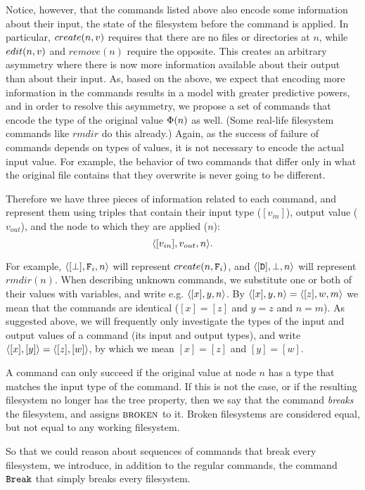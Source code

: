 Notice, however, that the commands listed above also encode some information about 
their input, the state of the filesystem
before the command is applied. In particular, $create(n,v)$ requires that there are no files
or directories at $n$, while $edit(n,v)$ and $remove(n)$ require the opposite.
This creates an arbitrary asymmetry where
there is now more information available about their output than about their input.
As, based on the above, we expect that encoding more information in the commands
results in a model with greater predictive powers,
and in order to resolve this asymmetry, 
we propose a set of commands that encode
the type of the original value $\Phi(n)$ as well.
(Some real-life filesystem commands like $rmdir$ do this already.)
Again, as the success of failure of commands depends on types of values,
it is not necessary to encode the actual input value.
For example, the behavior of two commands that differ only in what the original file contains
that they overwrite is never going to be different.

\begin{mydef}
Therefore we have three pieces of information related to each command,
and represent them using triples that contain
their input type ($[v_{in}]$), output value ($v_{out}$),
and the node to which they are applied ($n$):
\[ \langle{[v_{in}],v_{out},n}\rangle. \]
\end{mydef}

For example, $\langle{[\bot],\mathtt{F}_i,n}\rangle$ will represent $create(n,\mathtt{F}_i)$,
and $\langle{[\mathtt{D}],\bot,n}\rangle$ will represent $rmdir(n)$.
When describing unknown commands, we substitute one or both
of their values with variables, and write e.g. $\langle{[x],y,n}\rangle$.
By $\langle{[x],y,n}\rangle=\langle{[z],w,m}\rangle$ we mean that the commands are identical
($[x]=[z]$ and $y=z$ and $n=m$).
As suggested above, we will frequently only investigate
the types of the input and output values of a command
(its input and output types), and write
$\langle{[x],[y]}\rangle=\langle{[z],[w]}\rangle$, by which we mean $[x]=[z]$ and $[y]=[w]$.

\bigskip

\noindent
A command can only succeed if the original value at node $n$ has a type that matches
the input type of the command. If this is not the case, or if the resulting
filesystem no longer has the tree property, then we say that the command
{\em breaks} the filesystem, and assigns $\text{\normalfont\scshape{broken}}$ to it.
Broken filesystems are considered equal, but not equal to any working filesystem.

So that we could reason about sequences of commands that break every filesystem, 
we introduce, in addition to the regular commands,
the command $\mathtt{Break}$ that simply breaks every filesystem.

